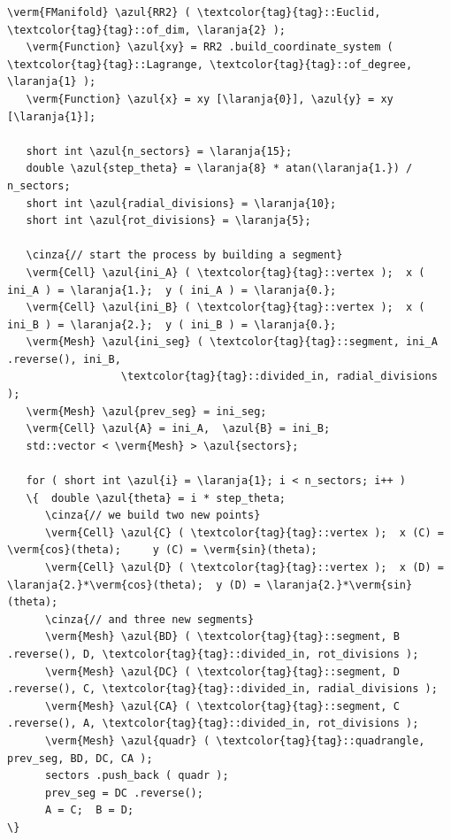 \begin{Verbatim}[commandchars=\\\{\},formatcom=\small\tt,frame=single,
   label=parag-\ref{\numb section 9.\numb parag 2}.cpp,rulecolor=\color{coment},
   baselinestretch=0.94,framesep=2mm                                            ]
   \verm{FManifold} \azul{RR2} ( \textcolor{tag}{tag}::Euclid, \textcolor{tag}{tag}::of_dim, \laranja{2} );
   \verm{Function} \azul{xy} = RR2 .build_coordinate_system ( \textcolor{tag}{tag}::Lagrange, \textcolor{tag}{tag}::of_degree, \laranja{1} );
   \verm{Function} \azul{x} = xy [\laranja{0}], \azul{y} = xy [\laranja{1}];

   short int \azul{n_sectors} = \laranja{15};
   double \azul{step_theta} = \laranja{8} * atan(\laranja{1.}) / n_sectors;
   short int \azul{radial_divisions} = \laranja{10};
   short int \azul{rot_divisions} = \laranja{5};

   \cinza{// start the process by building a segment}
   \verm{Cell} \azul{ini_A} ( \textcolor{tag}{tag}::vertex );  x ( ini_A ) = \laranja{1.};  y ( ini_A ) = \laranja{0.};
   \verm{Cell} \azul{ini_B} ( \textcolor{tag}{tag}::vertex );  x ( ini_B ) = \laranja{2.};  y ( ini_B ) = \laranja{0.};
   \verm{Mesh} \azul{ini_seg} ( \textcolor{tag}{tag}::segment, ini_A .reverse(), ini_B,
                  \textcolor{tag}{tag}::divided_in, radial_divisions     );
   \verm{Mesh} \azul{prev_seg} = ini_seg;
   \verm{Cell} \azul{A} = ini_A,  \azul{B} = ini_B;
   std::vector < \verm{Mesh} > \azul{sectors};

   for ( short int \azul{i} = \laranja{1}; i < n_sectors; i++ )
   \{  double \azul{theta} = i * step_theta;
      \cinza{// we build two new points}
      \verm{Cell} \azul{C} ( \textcolor{tag}{tag}::vertex );  x (C) = \verm{cos}(theta);     y (C) = \verm{sin}(theta);
      \verm{Cell} \azul{D} ( \textcolor{tag}{tag}::vertex );  x (D) = \laranja{2.}*\verm{cos}(theta);  y (D) = \laranja{2.}*\verm{sin}(theta);
      \cinza{// and three new segments}
      \verm{Mesh} \azul{BD} ( \textcolor{tag}{tag}::segment, B .reverse(), D, \textcolor{tag}{tag}::divided_in, rot_divisions );
      \verm{Mesh} \azul{DC} ( \textcolor{tag}{tag}::segment, D .reverse(), C, \textcolor{tag}{tag}::divided_in, radial_divisions );
      \verm{Mesh} \azul{CA} ( \textcolor{tag}{tag}::segment, C .reverse(), A, \textcolor{tag}{tag}::divided_in, rot_divisions );
      \verm{Mesh} \azul{quadr} ( \textcolor{tag}{tag}::quadrangle, prev_seg, BD, DC, CA );
      sectors .push_back ( quadr );
      prev_seg = DC .reverse();
      A = C;  B = D;                                                             \}


\end{Verbatim}
